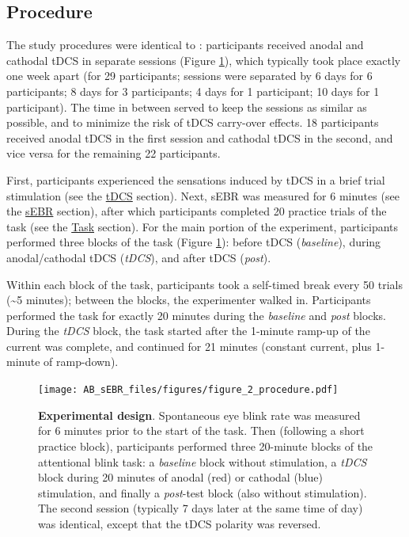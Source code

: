 \documentclass[11pt,]{memoir}
\begin{document}
\hypertarget{AB_sEBR-procedure}{%
\subsection{Procedure}\label{AB_sEBR-procedure}}

The study procedures were identical to \textcite{London2015}: participants received anodal and cathodal tDCS in separate sessions (Figure \ref{fig:AB-sEBR-fig-procedure}), which typically took place exactly one week apart (for 29 participants; sessions were separated by 6 days for 6 participants; 8 days for 3 participants; 4 days for 1 participant; 10 days for 1 participant). The time in between served to keep the sessions as similar as possible, and to minimize the risk of tDCS carry-over effects. 18 participants received anodal tDCS in the first session and cathodal tDCS in the second, and vice versa for the remaining 22 participants.

First, participants experienced the sensations induced by tDCS in a brief trial stimulation (see the \protect\hyperlink{AB_sEBR-tDCS}{tDCS} section). Next, sEBR was measured for 6 minutes (see the \protect\hyperlink{AB_sEBR-sEBR}{sEBR} section), after which participants completed 20 practice trials of the task (see the \protect\hyperlink{AB_sEBR-task}{Task} section). For the main portion of the experiment, participants performed three blocks of the task (Figure \ref{fig:AB-sEBR-fig-procedure}): before tDCS (\emph{baseline}), during anodal/cathodal tDCS (\emph{tDCS}), and after tDCS (\emph{post}).

Within each block of the task, participants took a self-timed break every 50 trials (\textasciitilde{}5 minutes); between the blocks, the experimenter walked in. Participants performed the task for exactly 20 minutes during the \emph{baseline} and \emph{post} blocks. During the \emph{tDCS} block, the task started after the 1-minute ramp-up of the current was complete, and continued for 21 minutes (constant current, plus 1-minute of ramp-down).

\begin{figure}
\centering
\texttt{[image: AB\_sEBR\_files/figures/figure\_2\_procedure.pdf]}
\caption{\label{fig:AB-sEBR-fig-procedure}\textbf{Experimental design}. Spontaneous eye blink rate was measured for 6 minutes prior to the start of the task. Then (following a short practice block), participants performed three 20-minute blocks of the attentional blink task: a \emph{baseline} block without stimulation, a \emph{tDCS} block during 20 minutes of anodal (red) or cathodal (blue) stimulation, and finally a \emph{post}-test block (also without stimulation). The second session (typically 7 days later at the same time of day) was identical, except that the tDCS polarity was reversed.}
\end{figure}
\end{document}
